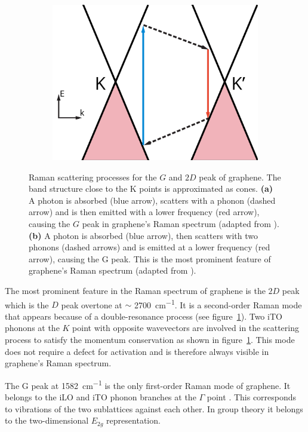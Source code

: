 \begin{figure}[!h]
\begin{subfigure}[t]{0.45\textwidth}
    \includegraphics[width=\textwidth]{./images/2d-mode.pdf}
  \end{subfigure}
  \caption{Raman scattering processes for the $G$ and $2D$ peak of graphene. The band structure close to the K points is approximated as cones. \textbf{(a)} A photon is absorbed (blue arrow), scatters with a phonon (dashed arrow) and is then emitted with a lower frequency (red arrow), causing the $G$ peak in graphene's Raman spectrum (adapted from \cite{Ferrari2013}). \textbf{(b)} A photon is absorbed (blue arrow), then scatters with two phonons (dashed arrows) and is emitted at a lower frequency (red arrow), causing the G peak. This is the most prominent feature of graphene's Raman spectrum (adapted from \cite{Ferrari2013}).}
  \label{fig:raman-modes}
\end{figure}

The most prominent feature in the Raman spectrum of graphene is the $2D$ peak which is the $D$ peak overtone at $\sim$ \SI{2700}{cm^{-1}}. It is a second-order Raman mode that appears because of a double-resonance process (see figure~\ref{fig:raman-modes}). Two iTO phonons at the $K$ point with opposite wavevectors are involved in the scattering process to satisfy the momentum conservation as shown in figure~\ref{fig:raman-modes}. This mode does not require a defect for activation and is therefore always visible in graphene's Raman spectrum.

The G peak at \SI{1582}{cm^{-1}} is the only first-order Raman mode of graphene. It belongs to the iLO and iTO phonon branches at the $\Gamma$ point \cite{Ferrari2013}. This corresponds to vibrations of the two sublattices against each other. In group theory it belongs to the two-dimensional $E_{2g}$ representation\cite{yucordona}.
